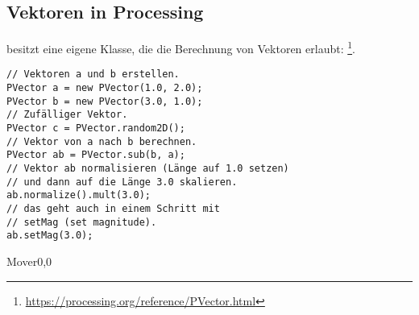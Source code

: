\documentclass[10pt, a4paper, ngerman]{arbeitsblatt}
\begin{document}
\vspace*{-4em}\subsection*{Vektoren in Processing}
 besitzt eine eigene Klasse, die die Berechnung von Vektoren erlaubt: \footnote{\url{https://processing.org/reference/PVector.html}}.

\begin{links}[.5]\centering
\begin{verbatim}
// Vektoren a und b erstellen.
PVector a = new PVector(1.0, 2.0);
PVector b = new PVector(3.0, 1.0);
// Zufälliger Vektor.
PVector c = PVector.random2D();
// Vektor von a nach b berechnen.
PVector ab = PVector.sub(b, a);
// Vektor ab normalisieren (Länge auf 1.0 setzen)
// und dann auf die Länge 3.0 skalieren.
ab.normalize().mult(3.0);
// das geht auch in einem Schritt mit
// setMag (set magnitude).
ab.setMag(3.0);
\end{verbatim}
\end{links}\begin{rechts}[.5]\centering
	\begin{klassendiagramm}%
		\begin{class}[text width=8cm]{Mover}{0,0}

		\end{class}
	\end{klassendiagramm}
\end{rechts}
\end{document}
